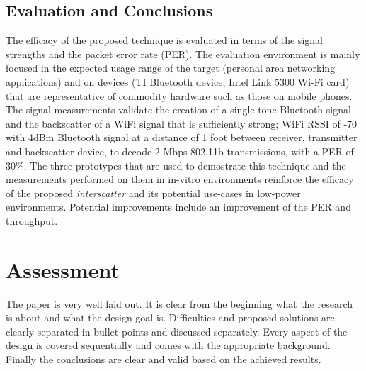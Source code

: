 \documentclass[a4paper]{article}
\begin{document}
\subsection{Evaluation and Conclusions}
The efficacy of the proposed technique is evaluated in terms of the signal strengths and the packet error rate (PER). The evaluation environment is mainly focused in the expected usage range of the target (personal area networking applications) and on devices (TI Bluetooth device, Intel Link 5300 Wi-Fi card) that are representative of commodity hardware such as those on mobile phones. The signal measurements validate the creation of a single-tone Bluetooth signal and the backscatter of a WiFi signal that is sufficiently strong; WiFi RSSI of -70 with 4dBm Bluetooth signal at a distance of 1 foot between receiver, transmitter and backscatter device, to decode 2 Mbps 802.11b transmissions, with a PER of 30\%. 
The three prototypes that are used to demostrate this technique and the measurements performed on them in in-vitro environments reinforce the efficacy of the proposed \textit{interscatter} and its potential use-cases in low-power environments. Potential improvements include an improvement of the PER and throughput.

\section{Assessment}
The paper is very well laid out. It is clear from the beginning what the research is about and what the design goal is. Difficulties and proposed solutions are clearly separated in bullet points and discussed separately. Every aspect of the design is covered sequentially and comes with the appropriate background. Finally the conclusions are clear and valid based on the achieved results.
\end{document}
